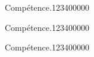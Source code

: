 
\begin{pageAD}  %
\restoregeometry %


\begin{ExoCad}{Compétence.}{1234}{0}{0}{0}{0}{0}

\end{ExoCad}


\begin{ExoCad}{Compétence.}{1234}{0}{0}{0}{0}{0}

\end{ExoCad}


\begin{ExoCad}{Compétence.}{1234}{0}{0}{0}{0}{0}

\end{ExoCad}
 
\end{pageAD} %


